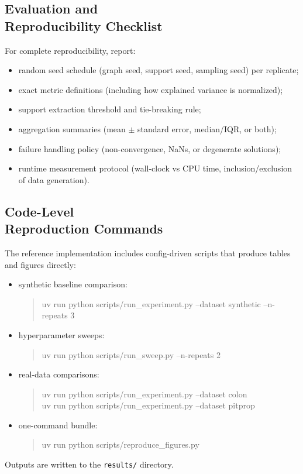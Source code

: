 \documentclass[10pt,twocolumn,letterpaper]{article}
\theoremstyle{definition}
\begin{document}
\subsection{\texorpdfstring{Evaluation and\\ Reproducibility Checklist}{Evaluation and Reproducibility Checklist}}
For complete reproducibility, report:
\begin{itemize}[leftmargin=*]
\item random seed schedule (graph seed, support seed, sampling seed) per replicate;
\item exact metric definitions (including how explained variance is normalized);
\item support extraction threshold and tie-breaking rule;
\item aggregation summaries (mean $\pm$ standard error, median/IQR, or both);
\item failure handling policy (non-convergence, NaNs, or degenerate solutions);
\item runtime measurement protocol (wall-clock vs CPU time, inclusion/exclusion of data generation).
\end{itemize}

\subsection{\texorpdfstring{Code-Level\\ Reproduction Commands}{Code-Level Reproduction Commands}}
The reference implementation includes config-driven scripts that produce tables and figures directly:
\begin{itemize}[leftmargin=*]
\item synthetic baseline comparison:
\begin{quote}\raggedright\ttfamily\small
uv run python scripts/run\_experiment.py --dataset synthetic --n-repeats 3
\end{quote}
\item hyperparameter sweeps:
\begin{quote}\raggedright\ttfamily\small
uv run python scripts/run\_sweep.py --n-repeats 2
\end{quote}
\item real-data comparisons:
\begin{quote}\raggedright\ttfamily\small
uv run python scripts/run\_experiment.py --dataset colon\\
uv run python scripts/run\_experiment.py --dataset pitprop
\end{quote}
\item one-command bundle:
\begin{quote}\raggedright\ttfamily\small
uv run python scripts/reproduce\_figures.py
\end{quote}
\end{itemize}
Outputs are written to the \mbox{\texttt{results/}} directory.

\fussy


\end{document}
